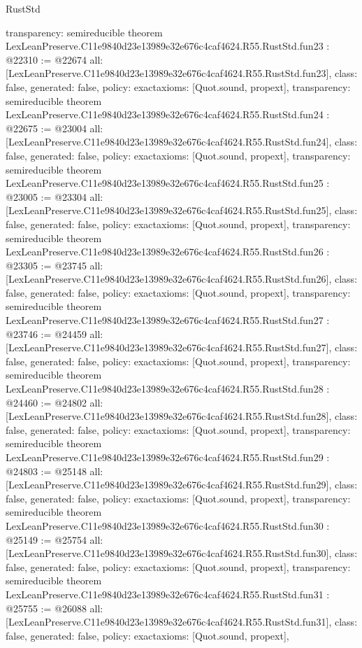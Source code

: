 \begin{lexlean}{RustStd}
\begin{coremodule}
{  transparency: semireducible
}
theorem LexLeanPreserve.C11e9840d23e13989e32e676c4caf4624.R55.RustStd.fun23 : @22310 := @22674 {
  all: [LexLeanPreserve.C11e9840d23e13989e32e676c4caf4624.R55.RustStd.fun23],
  class: false,
  generated: false,
  policy: exact{axioms: [Quot.sound, propext]},
  transparency: semireducible
}
theorem LexLeanPreserve.C11e9840d23e13989e32e676c4caf4624.R55.RustStd.fun24 : @22675 := @23004 {
  all: [LexLeanPreserve.C11e9840d23e13989e32e676c4caf4624.R55.RustStd.fun24],
  class: false,
  generated: false,
  policy: exact{axioms: [Quot.sound, propext]},
  transparency: semireducible
}
theorem LexLeanPreserve.C11e9840d23e13989e32e676c4caf4624.R55.RustStd.fun25 : @23005 := @23304 {
  all: [LexLeanPreserve.C11e9840d23e13989e32e676c4caf4624.R55.RustStd.fun25],
  class: false,
  generated: false,
  policy: exact{axioms: [Quot.sound, propext]},
  transparency: semireducible
}
theorem LexLeanPreserve.C11e9840d23e13989e32e676c4caf4624.R55.RustStd.fun26 : @23305 := @23745 {
  all: [LexLeanPreserve.C11e9840d23e13989e32e676c4caf4624.R55.RustStd.fun26],
  class: false,
  generated: false,
  policy: exact{axioms: [Quot.sound, propext]},
  transparency: semireducible
}
theorem LexLeanPreserve.C11e9840d23e13989e32e676c4caf4624.R55.RustStd.fun27 : @23746 := @24459 {
  all: [LexLeanPreserve.C11e9840d23e13989e32e676c4caf4624.R55.RustStd.fun27],
  class: false,
  generated: false,
  policy: exact{axioms: [Quot.sound, propext]},
  transparency: semireducible
}
theorem LexLeanPreserve.C11e9840d23e13989e32e676c4caf4624.R55.RustStd.fun28 : @24460 := @24802 {
  all: [LexLeanPreserve.C11e9840d23e13989e32e676c4caf4624.R55.RustStd.fun28],
  class: false,
  generated: false,
  policy: exact{axioms: [Quot.sound, propext]},
  transparency: semireducible
}
theorem LexLeanPreserve.C11e9840d23e13989e32e676c4caf4624.R55.RustStd.fun29 : @24803 := @25148 {
  all: [LexLeanPreserve.C11e9840d23e13989e32e676c4caf4624.R55.RustStd.fun29],
  class: false,
  generated: false,
  policy: exact{axioms: [Quot.sound, propext]},
  transparency: semireducible
}
theorem LexLeanPreserve.C11e9840d23e13989e32e676c4caf4624.R55.RustStd.fun30 : @25149 := @25754 {
  all: [LexLeanPreserve.C11e9840d23e13989e32e676c4caf4624.R55.RustStd.fun30],
  class: false,
  generated: false,
  policy: exact{axioms: [Quot.sound, propext]},
  transparency: semireducible
}
theorem LexLeanPreserve.C11e9840d23e13989e32e676c4caf4624.R55.RustStd.fun31 : @25755 := @26088 {
  all: [LexLeanPreserve.C11e9840d23e13989e32e676c4caf4624.R55.RustStd.fun31],
  class: false,
  generated: false,
  policy: exact{axioms: [Quot.sound, propext]},
}
\end{coremodule}
\end{lexlean}
